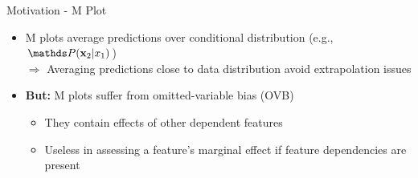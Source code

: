 \documentclass[11pt,compress,t,notes=noshow, aspectratio=169, xcolor=table]{beamer}
\begin{document}
\begin{frame}{Motivation - M Plot}
\begin{itemize}
    \item M plots average predictions over conditional distribution (e.g., $\P(\xv_2|x_1)$)\\
    $\Rightarrow$ Averaging predictions close to data distribution avoid extrapolation issues
    \item \textbf{But:} M plots suffer from omitted-variable bias (OVB)
\begin{itemize}
\item They contain effects of other dependent features
\item Useless in assessing a feature's marginal effect if feature dependencies are present
\end{itemize}
\end{itemize}


\end{frame}



\end{document}
